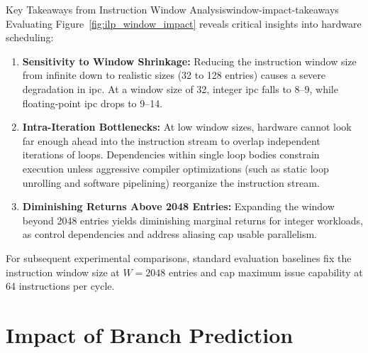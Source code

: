 \begin{observation}{Key Takeaways from Instruction Window Analysis}{window-impact-takeaways}
Evaluating Figure~\ref{fig:ilp_window_impact} reveals critical insights into hardware scheduling:
\begin{enumerate}
    \item \textbf{Sensitivity to Window Shrinkage:} Reducing the instruction window size from infinite down to realistic sizes (32 to 128 entries) causes a severe degradation in \gls{ipc}. At a window size of 32, integer \gls{ipc} falls to 8--9, while floating-point \gls{ipc} drops to 9--14.
    \item \textbf{Intra-Iteration Bottlenecks:} At low window sizes, hardware cannot look far enough ahead into the instruction stream to overlap independent iterations of loops. Dependencies within single loop bodies constrain execution unless aggressive compiler optimizations (such as static loop unrolling and software pipelining) reorganize the instruction stream.
    \item \textbf{Diminishing Returns Above 2048 Entries:} Expanding the window beyond 2048 entries yields diminishing marginal returns for integer workloads, as control dependencies and address aliasing cap usable parallelism.
\end{enumerate}
\end{observation}

For subsequent experimental comparisons, standard evaluation baselines fix the instruction window size at $W = 2048$ entries and cap maximum issue capability at 64 instructions per cycle.

\section{Impact of Branch Prediction}
\label{sec:branch_impact}

